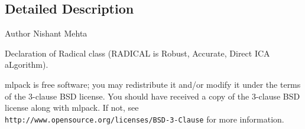\subsection{Detailed Description}
\begin{DoxyAuthor}{Author}
Nishant Mehta
\end{DoxyAuthor}
Declaration of Radical class (R\+A\+D\+I\+C\+AL is Robust, Accurate, Direct I\+CA a\+Lgorithm).

mlpack is free software; you may redistribute it and/or modify it under the terms of the 3-\/clause B\+SD license. You should have received a copy of the 3-\/clause B\+SD license along with mlpack. If not, see {\tt http\+://www.\+opensource.\+org/licenses/\+B\+S\+D-\/3-\/\+Clause} for more information. 